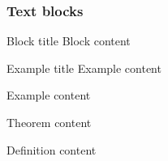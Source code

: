 \documentclass{beamer}
\begin{document}
\begin{frame}
  \frametitle{Text blocks}
  
  \begin{block}{Block title}
    Block content
  \end{block}

  \begin{exampleblock}{Example title}
    Example content
  \end{exampleblock}

  \begin{example}
    Example content
  \end{example}

  \begin{theorem}
    Theorem content
  \end{theorem}

  \begin{definition}
    Definition content
  \end{definition}
\end{frame}
\end{document}
